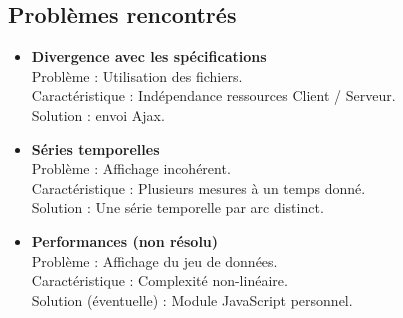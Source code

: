 		\subsection*{Problèmes rencontrés}
		\begin{frame}
			\begin{itemize}
			\item \textbf{Divergence avec les spécifications}\\
				\hspace{1em} Problème : Utilisation des fichiers.\\
				\hspace{1em} Caractéristique : Indépendance ressources Client / Serveur.\\
				\hspace{1em} Solution : envoi Ajax.\vspace{1em} \pause
				
			\item \textbf{Séries temporelles}\\
				\hspace{1em} Problème : Affichage incohérent.\\
				\hspace{1em} Caractéristique : Plusieurs mesures à un temps donné.\\
				\hspace{1em} Solution : Une série temporelle par arc distinct.\vspace{1em} \pause
				
			\item \textbf{Performances (non résolu)}\\
				\hspace{1em} Problème : Affichage du jeu de données.\\
				\hspace{1em} Caractéristique : Complexité non-linéaire.\\
				\hspace{1em} Solution (éventuelle) : Module JavaScript personnel.
			\end{itemize}
		\end{frame}
	
